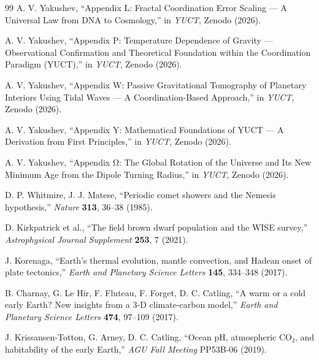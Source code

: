 \documentclass[11pt,a4paper]{article}
\begin{document}
\begin{thebibliography}{99}
		A. V. Yakushev, ``Appendix L: Fractal Coordination Error Scaling — A Universal Law from DNA to Cosmology,''
		in \emph{YUCT}, Zenodo (2026).
		
		A. V. Yakushev, ``Appendix P: Temperature Dependence of Gravity — Observational Confirmation and Theoretical Foundation within the Coordination Paradigm (YUCT),''
		in \emph{YUCT}, Zenodo (2026).
		
		A. V. Yakushev, ``Appendix W: Passive Gravitational Tomography of Planetary Interiors Using Tidal Waves — A Coordination-Based Approach,''
		in \emph{YUCT}, Zenodo (2026).
		
		A. V. Yakushev, ``Appendix Y: Mathematical Foundations of YUCT — A Derivation from First Principles,''
		in \emph{YUCT}, Zenodo (2026).
		
		A. V. Yakushev, ``Appendix Ω: The Global Rotation of the Universe and Its New Minimum Age from the Dipole Turning Radius,''
		in \emph{YUCT}, Zenodo (2026).
		
		
		D. P. Whitmire, J. J. Matese, ``Periodic comet showers and the Nemesis hypothesis,''
		\emph{Nature} \textbf{313}, 36–38 (1985).
		
		D. Kirkpatrick et al., ``The field brown dwarf population and the WISE survey,''
		\emph{Astrophysical Journal Supplement} \textbf{253}, 7 (2021).
		
		J. Korenaga, ``Earth’s thermal evolution, mantle convection, and Hadean onset of plate tectonics,''
		\emph{Earth and Planetary Science Letters} \textbf{145}, 334–348 (2017).
		
		B. Charnay, G. Le Hir, F. Fluteau, F. Forget, D. C. Catling, ``A warm or a cold early Earth? New insights from a 3‑D climate‑carbon model,''
		\emph{Earth and Planetary Science Letters} \textbf{474}, 97–109 (2017).
		
		J. Krissansen‑Totton, G. Arney, D. C. Catling, ``Ocean pH, atmospheric CO₂, and habitability of the early Earth,''
		\emph{AGU Fall Meeting} PP53B‑06 (2019).
		

\end{thebibliography}
\end{document}
